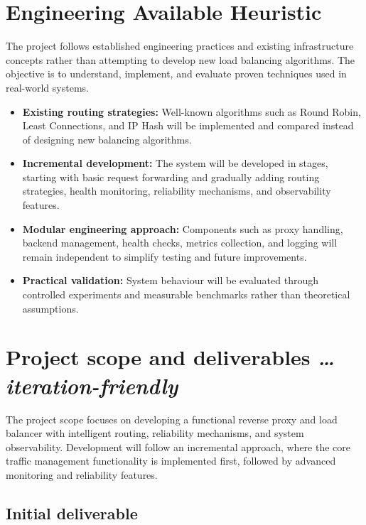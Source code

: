 \documentclass[11pt,a4paper]{article}
\newcommand{\BvrHint}[1]{%
  {\normalfont\normalsize\itshape\hfill #1}}
\begin{document}
\section{Engineering Available Heuristic}

The project follows established engineering practices and existing infrastructure concepts rather than attempting to develop new load balancing algorithms. The objective is to understand, implement, and evaluate proven techniques used in real-world systems.

\begin{itemize}
    \item \textbf{Existing routing strategies:} Well-known algorithms such as Round Robin, Least Connections, and IP Hash will be implemented and compared instead of designing new balancing algorithms.

    \item \textbf{Incremental development:} The system will be developed in stages, starting with basic request forwarding and gradually adding routing strategies, health monitoring, reliability mechanisms, and observability features.

    \item \textbf{Modular engineering approach:} Components such as proxy handling, backend management, health checks, metrics collection, and logging will remain independent to simplify testing and future improvements.

    \item \textbf{Practical validation:} System behaviour will be evaluated through controlled experiments and measurable benchmarks rather than theoretical assumptions.
\end{itemize}

\section{Project scope and deliverables %
\BvrHint{\ldots iteration-friendly}}

The project scope focuses on developing a functional reverse proxy and load balancer with intelligent routing, reliability mechanisms, and system observability. Development will follow an incremental approach, where the core traffic management functionality is implemented first, followed by advanced monitoring and reliability features.


\subsection{Initial deliverable}
\end{document}
